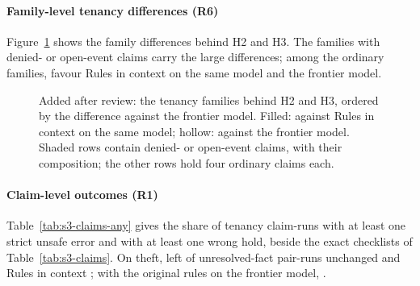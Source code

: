 \paragraph{Family-level tenancy differences (R6)}
Figure~\ref{fig:families} shows the \sthreeRSixFamilies{} family differences behind H2 and H3. The \sthreeRSixGatingFamilies{} families with denied- or open-event claims carry the large differences; among the ordinary families, \sthreeRSixOrdinaryFamiliesFavourRic{} favour Rules in context on the same model and \sthreeRSixOrdinaryFamiliesFavourRicFrontier{} the frontier model.

\begin{figure}[h]
\centering
{}
\caption{Added after review: the \sthreeRSixFamilies{} tenancy families behind H2 and H3, ordered by the difference against the frontier model. Filled: against Rules in context on the same model; hollow: against the frontier model. Shaded rows contain denied- or open-event claims, with their composition; the other rows hold four ordinary claims each.}
\label{fig:families}
\end{figure}

\paragraph{Claim-level outcomes (R1)}
Table~\ref{tab:s3-claims-any} gives the share of tenancy claim-runs with at least one strict unsafe error and with at least one wrong hold, beside the exact checklists of Table~\ref{tab:s3-claims}. On theft, \casepath left \sthreeROneCasePathThUnchanged{} of unresolved-fact pair-runs unchanged and Rules in context \sthreeROneRicThUnchanged; with the original rules on the frontier model, \sthreeROneRicOrigFrontierThUnchanged.

